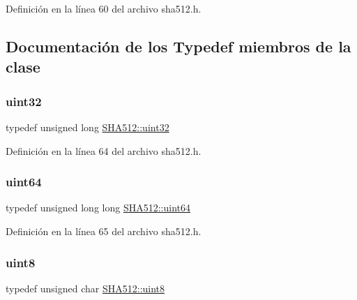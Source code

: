 Definición en la línea 60 del archivo sha512.\+h.



\subsection{Documentación de los \textquotesingle{}Typedef\textquotesingle{} miembros de la clase}
\hypertarget{classSHA512_a52085ac598de8ad6c5f157eafcefc047}{}\label{classSHA512_a52085ac598de8ad6c5f157eafcefc047} 
\subsubsection{\texorpdfstring{uint32}{uint32}}
{\footnotesize\ttfamily typedef unsigned long \hyperlink{classSHA512_a52085ac598de8ad6c5f157eafcefc047}{S\+H\+A512\+::uint32}\hspace{0.3cm}{\ttfamily [protected]}}



Definición en la línea 64 del archivo sha512.\+h.

\hypertarget{classSHA512_af8e6d233ae15030174e481d6d79b1786}{}\label{classSHA512_af8e6d233ae15030174e481d6d79b1786} 
\subsubsection{\texorpdfstring{uint64}{uint64}}
{\footnotesize\ttfamily typedef unsigned long long \hyperlink{classSHA512_af8e6d233ae15030174e481d6d79b1786}{S\+H\+A512\+::uint64}\hspace{0.3cm}{\ttfamily [protected]}}



Definición en la línea 65 del archivo sha512.\+h.

\hypertarget{classSHA512_a92a2b23b4b5217fefcb5b1884f40c054}{}\label{classSHA512_a92a2b23b4b5217fefcb5b1884f40c054} 
\subsubsection{\texorpdfstring{uint8}{uint8}}
{\footnotesize\ttfamily typedef unsigned char \hyperlink{classSHA512_a92a2b23b4b5217fefcb5b1884f40c054}{S\+H\+A512\+::uint8}\hspace{0.3cm}{\ttfamily [protected]}}



